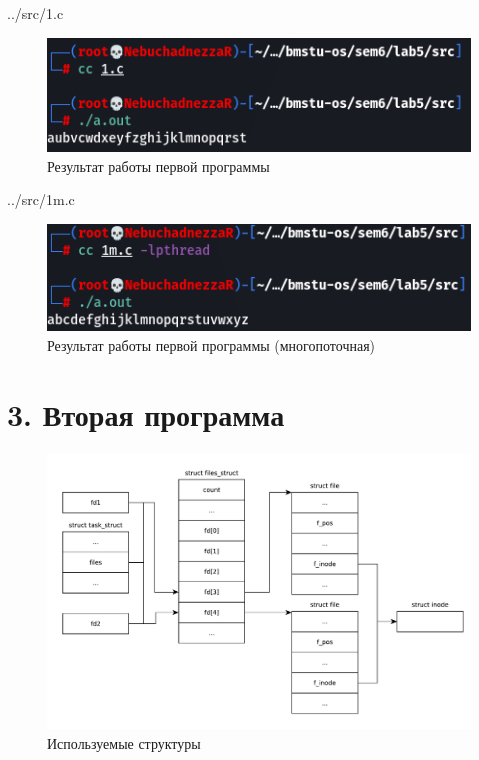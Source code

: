 \clearpage

\begin{lstinputlisting}[
	caption={Исходный код первой программы},
	style={c},
	]{../src/1.c}
\end{lstinputlisting}

\begin{figure}[h!btp]
	\centering
	\includegraphics[width=490pt]{inc/1.png}
	\caption{Результат работы первой программы}
	\label{fig:res1}	
\end{figure}

\clearpage

\begin{lstinputlisting}[
	caption={Исходный код первой программы (многопоточная)},
	style={c},
	]{../src/1m.c}
\end{lstinputlisting}

\begin{figure}[h!btp]
	\includegraphics[width=490pt]{inc/1m.png}
	\caption{Результат работы первой программы (многопоточная)}
	\label{fig:res1m}	
\end{figure}

\clearpage

\section*{3. Вторая программа}

\begin{figure}[h!btp]
	\centering
	\includegraphics[width=490pt]{inc/scheme2.pdf}
	\caption{Используемые структуры}
	\label{fig:scheme2}	
\end{figure}

